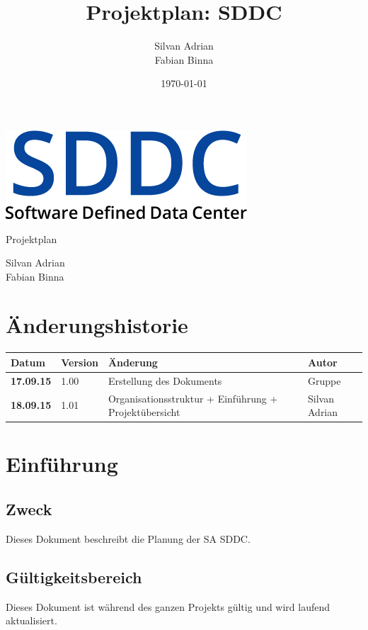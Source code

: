 \documentclass[11pt]{scrartcl}
\title{Projektplan: SDDC}
\author{Silvan Adrian \\ Fabian Binna}
\date{\today{}}
\begin{document}
\def\arraystretch{1.5}
\begin{titlepage}
\begin{center}
\vspace{10em}
\includegraphics[scale=2]{SDDC}
\vspace{10em}
\end{center}
\begin{center}
\huge {Projektplan}
\end{center}
\begin{center}
\vspace{10em}
\LARGE {Silvan Adrian} \\
\LARGE {Fabian Binna}
\end{center}

\end{titlepage}

\newpage
\section{Änderungshistorie}
\begin{tabularx}{\textwidth}{l l X l}
\textbf{Datum} & \textbf{Version} & \textbf{Änderung}  & \textbf{Autor} \\
\hline
\textbf{17.09.15} & 1.00 & Erstellung des Dokuments & Gruppe \\
\textbf{18.09.15} & 1.01 & Organisationsstruktur + Einführung + 
Projektübersicht & Silvan Adrian\\

\end{tabularx}

\newpage
\tableofcontents
\newpage

\section{Einführung}
\subsection{Zweck}
Dieses Dokument beschreibt die Planung der SA SDDC.
\subsection{Gültigkeitsbereich}
Dieses Dokument ist während des ganzen Projekts gültig und wird laufend aktualisiert.
\end{document}
